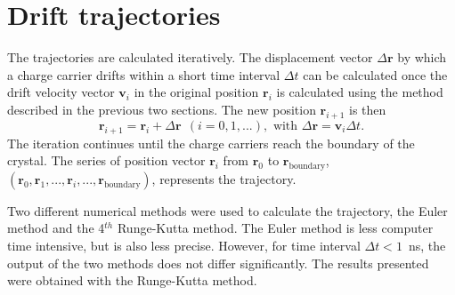 \section{Drift trajectories }
\label{sec:pss:trj}
The trajectories are calculated iteratively. The displacement vector $\Delta \mathbf{r}$ by which a charge carrier drifts within a short time interval $\Delta t$ can be calculated once the drift velocity vector $\mathbf{v}_{i}$ in the original position $\mathbf{r}_{i}$ is calculated using the method described in the previous two sections. The new position $\mathbf{r}_{i+1}$ is then
\begin{equation}
\label{eq:pss:pos}
\mathbf{r}_{i+1} = \mathbf{r}_{i} + \Delta \mathbf{r} \ \ (i=0,1,...), \text{ with } \Delta \mathbf{r} = \mathbf{v}_{i} \Delta t.
\end{equation}
The iteration continues until the charge carriers reach the boundary of the crystal. The series of position vector $\mathbf{r}_{i}$ from $\mathbf{r}_{0}$ to $\mathbf{r}_{\text{boundary}}$, $(\mathbf{r}_{0}, \mathbf{r}_{1}, ..., \mathbf{r}_{i}, ..., \mathbf{r}_{\text{boundary}})$, represents the trajectory.

Two different numerical methods were used to calculate the trajectory, the Euler method and the 4$^{th}$ Runge-Kutta method. The Euler method is less computer time intensive, but is also less precise. However, for time interval $\Delta t < 1$~ns, the output of the two methods does not differ significantly. The results presented were obtained with the Runge-Kutta method.

